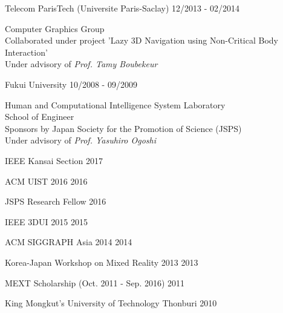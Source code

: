 \documentclass[11pt]{article} %
\begin{document}

\begin{description}
	\squish
	{Telecom ParisTech (Universite Paris-Saclay)}
	{12/2013 - 02/2014}
	
	Computer Graphics Group\\
	Collaborated under project 'Lazy 3D Navigation using Non-Critical Body Interaction'\\
	Under advisory of \textit{Prof. Tamy Boubekeur}
	
	{Fukui University}
	{10/2008 - 09/2009}
	
	Human and Computational Intelligence System Laboratory\\
	School of Engineer\\
	Sponsors by Japan Society for the Promotion of Science (JSPS)\\
	Under advisory of \textit{Prof. Yasuhiro Ogoshi}
	
\end{description}


\begin{description}
	\squish
	{IEEE Kansai Section}
	{2017}
	
	{ACM UIST 2016}
	{2016}
	
	{JSPS Research Fellow}
	{2016}
	
	{IEEE 3DUI 2015}
	{2015}
	
	{ACM SIGGRAPH Asia 2014}
	{2014}
	
	{Korea-Japan Workshop on Mixed Reality 2013}
	{2013}
	
	{MEXT Scholarship (Oct. 2011 - Sep. 2016)}
	{2011}
	
	{King Mongkut's University of Technology Thonburi}
	{2010}
	
	\bigskip
	
\end{description}

\end{document}
